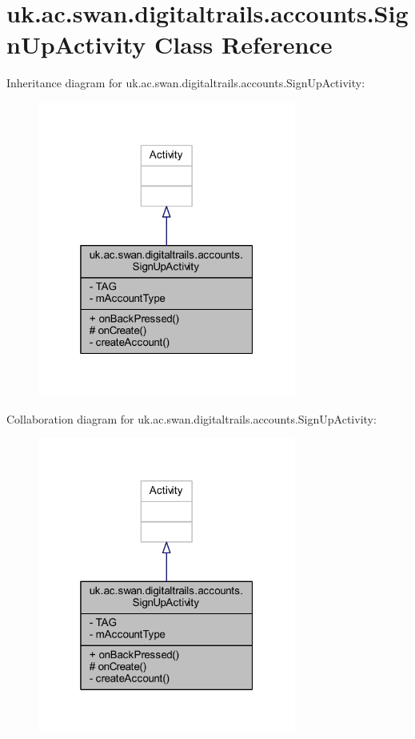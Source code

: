 \hypertarget{classuk_1_1ac_1_1swan_1_1digitaltrails_1_1accounts_1_1_sign_up_activity}{\section{uk.\+ac.\+swan.\+digitaltrails.\+accounts.\+Sign\+Up\+Activity Class Reference}
\label{classuk_1_1ac_1_1swan_1_1digitaltrails_1_1accounts_1_1_sign_up_activity}
}


Inheritance diagram for uk.\+ac.\+swan.\+digitaltrails.\+accounts.\+Sign\+Up\+Activity\+:
\nopagebreak
\begin{figure}[H]
\begin{center}
\leavevmode
\includegraphics[width=241pt]{classuk_1_1ac_1_1swan_1_1digitaltrails_1_1accounts_1_1_sign_up_activity__inherit__graph}
\end{center}
\end{figure}


Collaboration diagram for uk.\+ac.\+swan.\+digitaltrails.\+accounts.\+Sign\+Up\+Activity\+:
\nopagebreak
\begin{figure}[H]
\begin{center}
\leavevmode
\includegraphics[width=241pt]{classuk_1_1ac_1_1swan_1_1digitaltrails_1_1accounts_1_1_sign_up_activity__coll__graph}
\end{center}
\end{figure}
